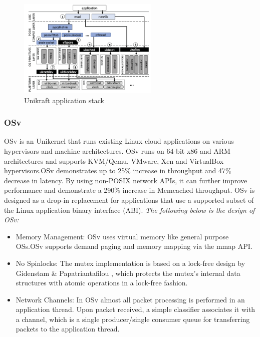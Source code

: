 \begin{figure}[htbp!] 
  \centering    
  \includegraphics[width=0.6\textwidth]{UnikraftStack}
  \caption[Unikraft]{Unikraft application stack \cite{Unikraft}}
  \label{fig:UnikraftStack}
  \end{figure}

\subsubsection{OSv}
OSv\cite{OSvPaper} is an Unikernel that runs existing Linux cloud applications on various hypervisors 
and machine architectures. OSv runs on 64-bit x86 and
ARM architectures and supports KVM/Qemu, VMware, Xen and VirtualBox 
hypervisors.OSv demonstrates up to 25\% increase in throughput and 47\% 
decrease in latency. 
By using non-POSIX network APIs,
it can further improve performance and demonstrate a
290\% increase in Memcached throughput.
OSv is designed as a drop-in replacement for applications that use a
supported subset of the Linux application binary interface (ABI).
\emph{The following below is the design of OSv:}
\begin{itemize}
  \item Memory Management: OSv uses virtual memory like
  general purpose OSs.OSv supports demand paging and memory mapping
  via the mmap API.
  \item No Spinlocks: The mutex implementation is based on a lock-free design 
  by Gidenstam \& Papatriantafilou \cite{LockFree}, which protects
  the mutex's internal data structures with atomic operations in a lock-free fashion.
  \item Network Channels: In OSv almost all packet processing is performed in an application thread. 
  Upon packet received, a simple classifier associates it with a channel, which is a single producer/single
  consumer queue for transferring packets to the application thread.
\end{itemize}

